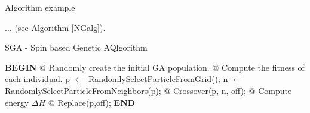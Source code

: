 \documentclass[runningheads,a4paper,11pt]{report}
\begin{document}
Algorithm example 

$\ldots$ (see Algorithm \ref{NGalg}).



\begin{algorithm}
	\caption{SGA - Spin based Genetic AQlgorithm}
	\label{NGalg}
		\begin{algorithmic}


			\STATE \textbf{BEGIN}
  		\STATE @ Randomly create the initial GA population.
  		\STATE @ Compute the fitness of each individual.
  				\STATE p $\leftarrow$ RandomlySelectParticleFromGrid();
  				\STATE n $\leftarrow$ RandomlySelectParticleFromNeighbors(p);
  				\STATE @ Crossover(p, n, off);
  				\STATE @ Compute energy $\Delta H$
  					\STATE @ Replace(p,off);
  				\ENDIF
  			\ENDFOR
  		\ENDFOR
  		\STATE \textbf{END}
\end{algorithmic}
\end{algorithm}




\end{document}
